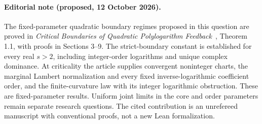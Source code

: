 \paragraph{Editorial note (proposed, 12 October 2026).}
The fixed-parameter quadratic boundary regimes proposed in this question
are proved in \emph{Critical Boundaries of Quadratic Polylogarithm
Feedback}~\cite{QuadraticBoundary2026}, Theorem 1.1, with proofs in Sections 3--9.
The strict-boundary constant is established for every real $s>2$, including
integer-order logarithms and unique complex dominance. At criticality the
article supplies convergent noninteger charts, the marginal Lambert
normalization and every fixed inverse-logarithmic coefficient order, and
the finite-curvature law with its integer logarithmic obstruction.
These are fixed-parameter results. Uniform joint limits in the core and
order parameters remain separate research questions. The cited contribution
is an unrefereed manuscript with conventional proofs, not a new Lean
formalization.

